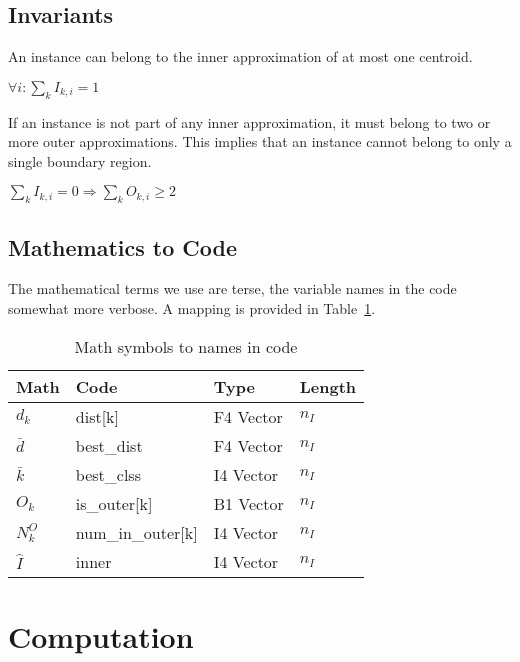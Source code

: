 \subsection{Invariants}

\begin{invariant}
An instance can belong to the inner approximation of at most one centroid.

\(\forall i: \sum_k I_{k, i} = 1\)
\end{invariant}

\begin{invariant}
If an instance is not part of any inner approximation, it must belong to 
two or more outer approximations. This implies that an instance cannot belong to only a single boundary region.

\(\sum_k I_{k, i} = 0 \Rightarrow \sum_k O_{k, i} \geq 2\)

\end{invariant}


\subsection{Mathematics to Code}
\label{math_to_code}
The mathematical terms we use are terse, the variable names in the code somewhat
more verbose. A mapping is provided in Table~\ref{tbl_mapping}.
\begin{table}[htbp]
\centering
\begin{tabular}{|l|l|l|l|} \hline
{\bf Math} & {\bf Code}     & {\bf Type} & {\bf Length} \\ \hline
\(d_k\) & dist[k] & F4 Vector & \(n_I\) \\ \hline
\(\bar{d}\) & best\_dist & F4 Vector & \(n_I\) \\ \hline
\(\bar{k}\) & best\_clss & I4 Vector & \(n_I\) \\ \hline
\(O_k\) & is\_outer[k] & B1 Vector & \(n_I\)  \\ \hline
\(N^O_k\) & num\_in\_outer[k] & I4 Vector & \(n_I\)  \\ \hline
\(\hat{I}\) & inner & I4 Vector & \(n_I\) \\ \hline
\hline
\end{tabular}
\caption{Math symbols to names in code}
\label{tbl_mapping}
\end{table}


\section{Computation}

